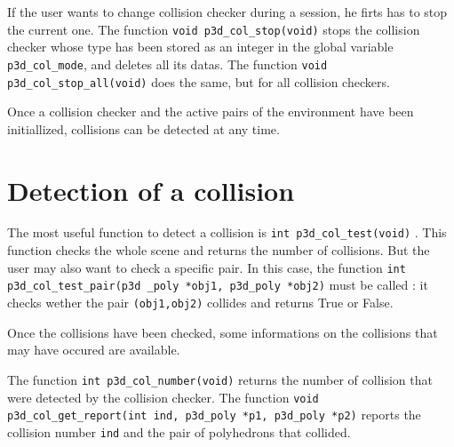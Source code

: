 


If the user wants to change collision checker during a session, he
firts has to stop the current one. The function {\tt void
p3d\_col\_stop(void)}  stops the collision checker whose type has been
stored as an integer in the global variable {\tt p3d\_col\_mode}, and
deletes all its datas. The function {\tt void
p3d\_col\_stop\_all(void)}  does the same,
but for all collision checkers.

Once a collision checker and the active pairs of the environment have
been initiallized, collisions can be detected at any time.

\section{Detection of a collision}

The most useful function to detect a collision is {\tt int
p3d\_col\_test(void)} . This function checks the whole scene and
returns the number of collisions. But the user may also want to check
a specific pair. In this case, the function {\tt int
p3d\_col\_test\_pair(p3d \_poly *obj1, p3d\_poly *obj2)}
 must be called :
it checks wether the pair {\tt (obj1,obj2)} collides and returns True
or False.

Once the collisions have been checked, some informations on the
collisions that may have occured are available. 

The function {\tt int p3d\_col\_number(void)} 
returns the number of collision that were detected by the collision
checker. The function {\tt void p3d\_col\_get\_report(int ind,
p3d\_poly *p1, p3d\_poly *p2)}  reports
the collision number {\tt ind} and the pair of polyhedrons that collided.



